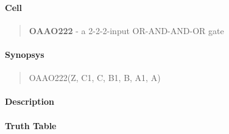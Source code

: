 \label{OAAO222}
\paragraph{Cell}
\begin{quote}
    \textbf{OAAO222} - a 2-2-2-input OR-AND-AND-OR gate
\end{quote}

\paragraph{Synopsys}
\begin{quote}
    OAAO222(Z, C1, C, B1, B, A1, A)
\end{quote}

\paragraph{Description}

%

\paragraph{Truth Table}
%

